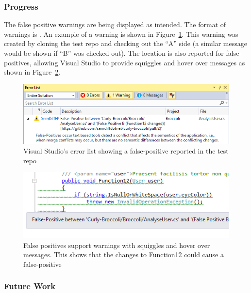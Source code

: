 \documentclass[draftclsnofoot,onecolumn]{IEEEtran}
\begin{document}
\subsubsection{Progress}
The false positive warnings are being displayed as intended. The format of 
warnings is . An example of a warning is shown in 
Figure~\ref{fperrorlist}. This warning was created by cloning the test repo and
checking out the “A” side (a similar message would be shown if “B” was checked 
out). The location is also reported for false-positives, allowing Visual Studio 
to provide squiggles and hover over messages as shown in 
Figure~\ref{fphoverover}.

\begin{figure}[!t]
\centering
\includegraphics[width=\textwidth]{FalsePositiveErrorList}
\caption{Visual Studio’s error list showing a false-positive reported in the 
test repo}
\label{fperrorlist}
\end{figure}

\begin{figure}[!t]
\centering
\includegraphics[width=\textwidth]{FalsePositiveHoverOver}
\caption{False positives support warnings with squiggles and hover over 
messages. This shows that the changes to Function12 could cause a 
false-positive}
\label{fphoverover}
\end{figure}

\subsubsection{Future Work}
\end{document}

